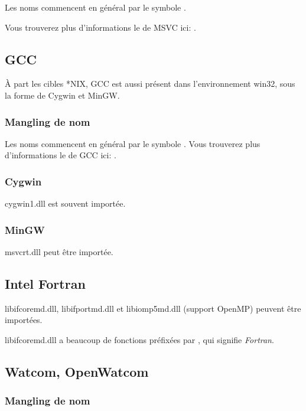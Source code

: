 Les noms commencent en général par le symbole .

Vous trouverez plus d'informations le  de
MSVC ici: .

\subsection{GCC}

À part les cibles *NIX, GCC est aussi présent dans l'environnement win32, sous la
forme de Cygwin et MinGW.

\subsubsection{Mangling de nom}

Les noms commencent en général par le symbole .
Vous trouverez plus d'informations le  de
GCC ici: .
\subsubsection{Cygwin}

cygwin1.dll est souvent importée.

\subsubsection{MinGW}

msvcrt.dll peut être importée.

\subsection{Intel Fortran}

libifcoremd.dll, libifportmd.dll et libiomp5md.dll (support OpenMP) peuvent être importées.

libifcoremd.dll a beaucoup de fonctions préfixées par , qui signifie \emph{Fortran}.

\subsection{Watcom, OpenWatcom}

\subsubsection{Mangling de nom}

